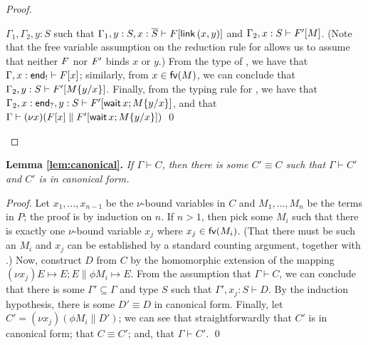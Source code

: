 \documentclass[oribibl,orivec,envcountsame]{llncs}
\begin{document}
\begin{proof}
\begin{itemize}
    $\Gamma_1,\Gamma_2,y:S$ such that $\Gamma_1,y:S,x:\gvdual{S} \vdash \Fx[\gvconst{link} \app (x,
    y)]$ and $\Gamma_2,x:S \vdash \Fx'[M]$.  (Note that the free variable assumption on the
    reduction rule for  allows us to assume that neither $\Fx$ nor $\Fx'$ binds $x$ or
    $y$.)  From the type of , we have that $\Gamma,x:\outterm \vdash \Fx[x]$;
    similarly, from $x \in \fv(M)$, we can conclude that $\Gamma_2,y:S \vdash \Fx'[M\{\bind x y\}]$.
    Finally, from the typing rule for , we have that $\Gamma_2,x:\interm,y:S \vdash
    \Fx'[\gvletunit{\gvconst{wait} \app x}{M\{\bind x y\}}]$, and that $\Gamma \vdash (\nu
    x)(\Fx[x] \parallel \Fx'[\gvletunit{\gvconst{wait} \app x}{M\{\bind x y\}}])$
  \qed
  \end{itemize}
\end{proof}


\noindent
\textbf{Lemma \ref{lem:canonical}.}
\textit{If $\Gamma \vdash C$, then there is some $C' \equiv C$ such that $\Gamma \vdash C'$ and $C'$ is in
  canonical form.}

\begin{proof}
  Let $x_1,\dots,x_{n-1}$ be the $\nu$-bound variables in $C$ and $M_1,\dots,M_n$ be the terms in
  $P$; the proof is by induction on $n$.  If $n > 1$, then pick some $M_i$ such that there is
  exactly one $\nu$-bound variable $x_j$ where $x_j \in \fv(M_i)$.  (That there must be such an
  $M_i$ and $x_j$ can be established by a standard counting argument, together with
  .)  Now, construct $D$ from $C$ by the homomorphic extension of
  the mapping $(\nu x_j)E \mapsto E; E \parallel \phi M_i \mapsto E$.  From the assumption
  that $\Gamma \vdash C$, we can conclude that there is some $\Gamma' \subseteq \Gamma$ and type $S$
  such that $\Gamma',x_j:S \vdash D$.  By the induction hypothesis, there is some $D' \equiv D$ in
  canonical form.  Finally, let $C' = (\nu x_j)(\phi M_i \parallel D')$; we can see that
  straightforwardly that $C'$ is in canonical form; that $C \equiv C'$; and, that $\Gamma \vdash
  C'$. \qed
\end{proof}
\end{document}
